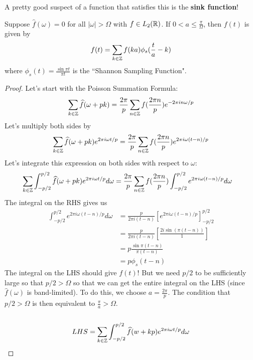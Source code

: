 \documentclass{article}
\begin{document}
A pretty good suspect of a function that satisfies this is the \textbf{sink function}!

\begin{theorem}
    Suppose $\widehat{f}(\omega) = 0$ for all $|\omega| > \Omega$ with $f \in L_2(\mathbb{R})$. If $0 < a \leq \frac{\pi}{\Omega}$, then $f(t)$ is given by
    \[f(t) = \sum_{k \in \mathbb{Z}} f(ka) \phi_s(\frac{t}{a} - k)\]
    where $\phi_s(t) = \frac{\sin \pi t }{\pi t}$ is the ``Shannon Sampling Function".
\end{theorem}

\begin{proof}
    Let's start with the Poisson Summation Formula:
    \[\sum_{k \in \mathbb{Z}} \widehat{f}(\omega + pk) = \frac{2\pi}{p} \sum_{n \in \mathbb{Z}} f(\frac{2\pi n}{p}) e^{-2\pi i n \omega/p}\]
    Let's multiply both sides by
    \[\sum_{k \in \mathbb{Z}} \widehat{f}(\omega + pk) e^{2\pi i \omega t/p} = \frac{2\pi}{p} \sum_{n \in \mathbb{Z}} f(\frac{2\pi n}{p}) e^{2\pi i\omega (t - n)/p}\]
    Let's integrate this expression on both sides with respect to $\omega$:
    \begin{align*}
        \sum_{k \in \mathbb{Z}} \int_{-p/2}^{p/2} \widehat{f}(\omega + pk) e^{2\pi i \omega t/p} d\omega &= \frac{2\pi}{p} \sum_{n \in \mathbb{Z}} f(\frac{2\pi n}{p}) \int_{-p/2}^{p/2} e^{2\pi i\omega (t - n)/p} d\omega
    \end{align*}
    The integral on the RHS gives us
    \begin{align*}
        \int_{-p/2}^{p/2} e^{2\pi i\omega (t - n)/p} d\omega &= \frac{p}{2\pi i (t-n)}[e^{2\pi i \omega (t - n)/p}]_{-p/2}^{p/2}\\
        &= \frac{p}{2\pi i (t-n)} [\frac{2i \sin(\pi(t - n))}{1}]\\
        &= p \frac{\sin \pi(t - n)}{\pi(t - n)}\\
        &= p \phi_s(t - n)
    \end{align*}
    The integral on the LHS should give $f(t)$! But we need $p/2$ to be sufficiently large so that $p/2 > \Omega$ so that we can get the entire integral on the LHS (since $\widehat{f}(\omega)$ is band-limited). To do this, we choose $a = \frac{2\pi}{p}$. The condition that $p/2 > \Omega$ is then equivalent to $\frac{\pi}{a} > \Omega$.\\\\
    \begin{align*}
        LHS &= \sum_{k \in \Zbb} \int_{-p/2}^{p/2} \widehat{f}(w + kp) e^{2\pi i \omega t/p} d\omega\\

\end{align*}
\end{proof}
\end{document}
